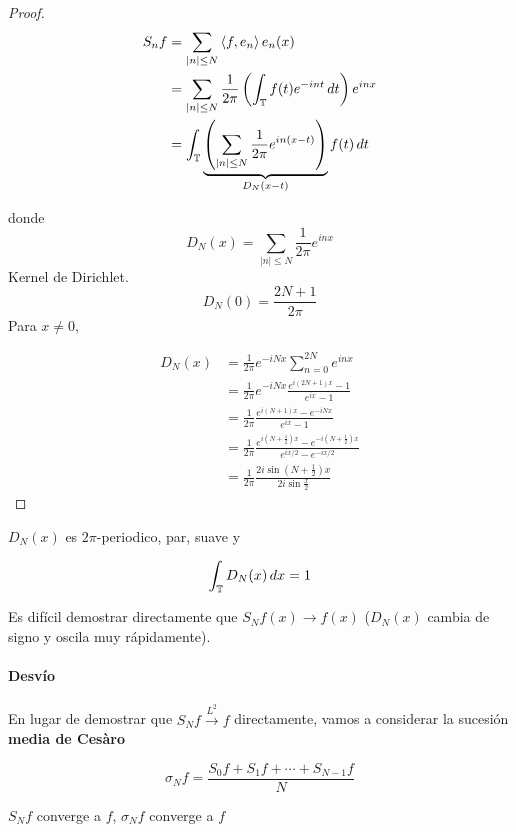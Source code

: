 \begin{proof}
    \begin{align*}
        S_n f&=\sum_{|n|\leq N}\left\langle f,e_n\right\rangle e_n(x)\\
        &=\sum_{|n|\leq N} \frac{1}{2\pi}\left( \int_{\mathbb{T}} f(t)e^{-int}\,dt\right) e^{inx}\\
        &=\int_{\mathbb{T}} \underbrace{\left(\sum_{|n|\leq N} \frac{1}{2\pi} e^{in(x-t)}\right)}_{D_N(x-t)}f(t)\,dt
    \end{align*}

    donde 
    \[D_N(x)=\sum_{|n|\leq N} \frac{1}{2\pi} e^{inx}\]
    Kernel de Dirichlet.
    \[D_N(0)=\frac{2N+1}{2\pi}\]
    Para $x\neq 0$,

    \begin{align*}
        D_N(x)&=\frac{1}{2\pi} e^{-iNx} \sum_{n=0}^{2N} e^{inx}\\
        &=\frac{1}{2\pi} e^{-iNx} \frac{e^{i(2N+1)x}-1}{e^{ix}-1}\\
        &=\frac{1}{2\pi} \frac{e^{i(N+1)x}-e^{-iNx}}{e^{ix}-1}\\
        &=\frac{1}{2\pi}\frac{e^{i(N+\frac{1}{2})x}-e^{-i(N+\frac{1}{2})x}}{e^{ix/2}-e^{-ix/2}}\\
        &=\frac{1}{2\pi}\frac{2i \sin(N+\frac{1}{2})x}{2i \sin \frac{x}{2}}
    \end{align*}
\end{proof}

\begin{fnote}
    $D_N(x)$ es $2\pi$-periodico, par, suave y 

    \[\int_{\mathbb{T}} D_N(x)\,dx=1\]


    Es difícil demostrar directamente que $S_N f(x)\to f(x)$ ($D_N(x)$ cambia de signo y oscila muy rápidamente). 
\end{fnote}

\paragraph{Desvío} En lugar de demostrar que $S_N f\xrightarrow{L^2}f$ directamente, vamos a considerar la sucesión \textbf{media de Cesàro}

\[\sigma_N f=\frac{S_0 f+S_1 f+\cdots + S_{N-1}f}{N}\]

\begin{fnote}
    $S_N f$ converge a $f$, $\sigma_N f$ converge a $f$
\end{fnote}

